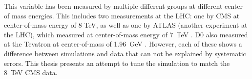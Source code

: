 This variable has been measured by multiple different groups at different center of mass energies. This includes two measurements at the LHC: one by CMS at center-of-mass energy of 8 TeV\cite{PhistarAnMINE}, as well as one by ATLAS (another experiment at the LHC), which measured \phistar at center-of-mass energy of 7~TeV \cite{PhistarAnAtlas}. D0 also measured \phistar at the Tevatron at center-of-mass of 1.96~GeV \cite{PhistarAn1}\cite{PhistarAn2}. However, each of these shows a difference between simulations and data that can not be explained by systematic errors. This thesis presents an attempt to tune the simulation to match the 8~TeV CMS data.

 

